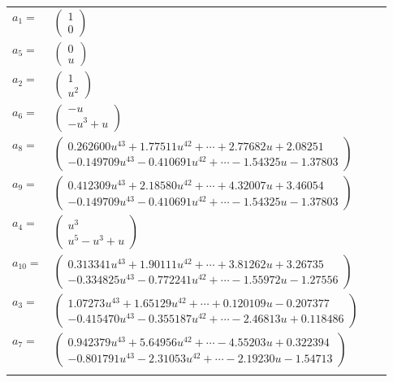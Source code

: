 \documentclass[1p]{elsarticle_modified}
\theoremstyle{definition}
\begin{document}
\begin{tabular}{m{7pt} m{180pt} m{7pt} m{180pt} }
\flushright $a_{1}=$&$\begin{pmatrix}1\\0\end{pmatrix}$ \\
\flushright $a_{5}=$&$\begin{pmatrix}0\\u\end{pmatrix}$ \\
\flushright $a_{2}=$&$\begin{pmatrix}1\\u^2\end{pmatrix}$ \\
\flushright $a_{6}=$&$\begin{pmatrix}- u\\- u^3+u\end{pmatrix}$ \\
\flushright $a_{8}=$&$\begin{pmatrix}0.262600 u^{43}+1.77511 u^{42}+\cdots+2.77682 u+2.08251\\-0.149709 u^{43}-0.410691 u^{42}+\cdots-1.54325 u-1.37803\end{pmatrix}$ \\
\flushright $a_{9}=$&$\begin{pmatrix}0.412309 u^{43}+2.18580 u^{42}+\cdots+4.32007 u+3.46054\\-0.149709 u^{43}-0.410691 u^{42}+\cdots-1.54325 u-1.37803\end{pmatrix}$ \\
\flushright $a_{4}=$&$\begin{pmatrix}u^3\\u^5- u^3+u\end{pmatrix}$ \\
\flushright $a_{10}=$&$\begin{pmatrix}0.313341 u^{43}+1.90111 u^{42}+\cdots+3.81262 u+3.26735\\-0.334825 u^{43}-0.772241 u^{42}+\cdots-1.55972 u-1.27556\end{pmatrix}$ \\
\flushright $a_{3}=$&$\begin{pmatrix}1.07273 u^{43}+1.65129 u^{42}+\cdots+0.120109 u-0.207377\\-0.415470 u^{43}-0.355187 u^{42}+\cdots-2.46813 u+0.118486\end{pmatrix}$ \\
\flushright $a_{7}=$&$\begin{pmatrix}0.942379 u^{43}+5.64956 u^{42}+\cdots-4.55203 u+0.322394\\-0.801791 u^{43}-2.31053 u^{42}+\cdots-2.19230 u-1.54713\end{pmatrix}$\\&\end{tabular}
\end{document}
